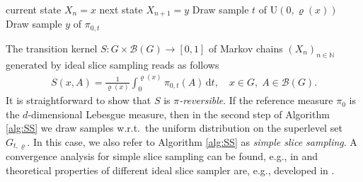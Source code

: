 \documentclass[sn-mathphys-num]{sn-jnl}%
\theoremstyle{thmstyleone}%
\theoremstyle{thmstyletwo}%
\theoremstyle{thmstylethree}%
\begin{document}
\begin{algorithm}
	\caption{Ideal Slice Sampling}\label{alg:SS}
	\renewcommand{\algorithmicrequire}{\textbf{Input:}}
	\renewcommand{\algorithmicensure}{\textbf{Output:}}
	\begin{algorithmic}[1]
		\Require current state $X_n = x$
		\Ensure next state $X_{n+1} = y$
		\State Draw sample $t$ of $\mathrm{U}(0,\varrho(x))$
		\State Draw sample $y$ of $\pi_{0,t}$
	\end{algorithmic}
\end{algorithm}

The transition kernel $S\colon G \times \mathcal{B}(G) \to [0,1]$ of Markov chains $(X_n)_{n\in\mathbb{N}}$ generated by ideal slice sampling reads as follows
\begin{align*}
	S(x,A) 
    =
    \frac{1}{\varrho(x)}\int_{0}^{\varrho(x)} \pi_{0,t}(A) \, \mathrm{d}t, \quad x\in G, \phantom{.} A\in\mathcal{B}(G).
\end{align*}
It is straightforward to show that $S$ is \emph{$\pi$-reversible}.
If the reference measure $\pi_0$ is the $d$-dimensional Lebesgue measure, then in the second step of Algorithm \ref{alg:SS} we draw samples w.r.t.~the uniform distribution on the superlevel set $G_{t,\varrho}$. 
In this case, we also refer to Algorithm \ref{alg:SS} as \emph{simple slice sampling}. 
A convergence analysis for simple slice sampling can be found, e.g., in \cite{RobertsRosenthal1999, MiraTierney2002,  NatarovskiiEtAl2021b} and theoretical properties of different ideal slice sampler are, e.g., developed in \cite{rudolf2024dimension,schar2023wasserstein,LatuszynskiRudolf2024,PowerEtAl2024}. 
\end{document}
